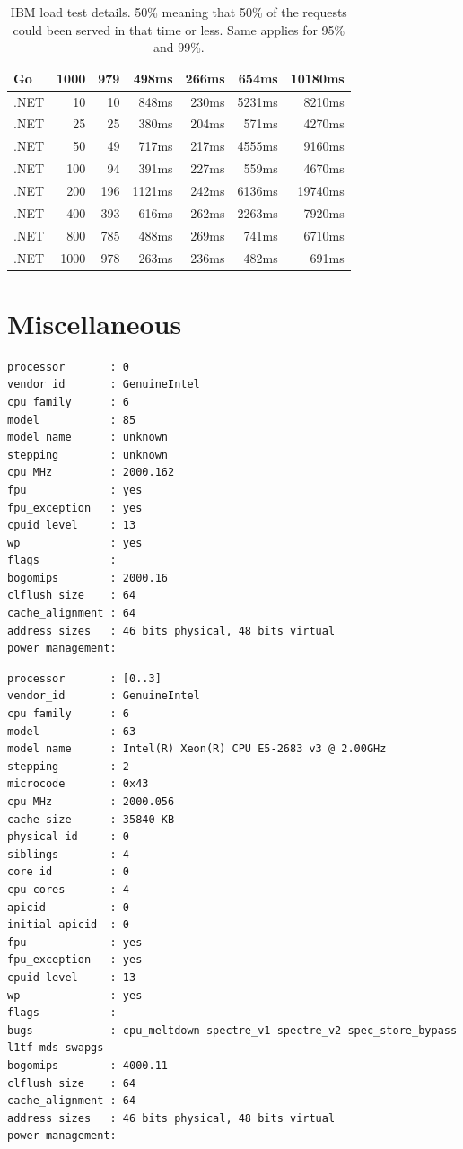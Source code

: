 \begin{table}[h]
\begin{tabular}{|l|r|r|r|r|r|r|}
Go	&	1000	&	979	&	498ms	&	266ms	&	654ms	&	10180ms	\\ \hline
.NET	&	10	&	10	&	848ms	&	230ms	&	5231ms	&	8210ms	\\ \hline
.NET	&	25	&	25	&	380ms	&	204ms	&	571ms	&	4270ms	\\ \hline
.NET	&	50	&	49	&	717ms	&	217ms	&	4555ms	&	9160ms	\\ \hline
.NET	&	100	&	94	&	391ms	&	227ms	&	559ms	&	4670ms	\\ \hline
.NET	&	200	&	196	&	1121ms	&	242ms	&	6136ms	&	19740ms	\\ \hline
.NET	&	400	&	393	&	616ms	&	262ms	&	2263ms	&	7920ms	\\ \hline
.NET	&	800	&	785	&	488ms	&	269ms	&	741ms	&	6710ms	\\ \hline
.NET	&	1000	&	978	&	263ms	&	236ms	&	482ms	&	691ms	\\ \hline
    \end{tabular}
    \caption[IBM load test details]{IBM load test details. 50\% meaning that 50\% of the requests could been served in that time or less. Same applies for 95\% and 99\%.}
    \label{table:ibm_load_test}
\end{table}


\chapter{Miscellaneous}

\begin{lstlisting}[frame=single,caption={Google Cloud Functions - Example content of \texttt{/proc/cpuinfo}},label=lst:cpuinfo]
processor       : 0
vendor_id       : GenuineIntel
cpu family      : 6
model           : 85
model name      : unknown
stepping        : unknown
cpu MHz         : 2000.162
fpu             : yes
fpu_exception   : yes
cpuid level     : 13
wp              : yes
flags           :
bogomips        : 2000.16
clflush size    : 64
cache_alignment : 64
address sizes   : 46 bits physical, 48 bits virtual
power management:
\end{lstlisting}

\begin{lstlisting}[frame=single,caption={IBM Cloud Functions - Example content of \texttt{/proc/cpuinfo}},label=lst:cpuinfo2]
processor       : [0..3]
vendor_id       : GenuineIntel
cpu family      : 6
model           : 63
model name      : Intel(R) Xeon(R) CPU E5-2683 v3 @ 2.00GHz
stepping        : 2
microcode       : 0x43
cpu MHz         : 2000.056
cache size      : 35840 KB
physical id     : 0
siblings        : 4
core id         : 0
cpu cores       : 4
apicid          : 0
initial apicid  : 0
fpu             : yes
fpu_exception   : yes
cpuid level     : 13
wp              : yes
flags           : 
bugs            : cpu_meltdown spectre_v1 spectre_v2 spec_store_bypass l1tf mds swapgs
bogomips        : 4000.11
clflush size    : 64
cache_alignment : 64
address sizes   : 46 bits physical, 48 bits virtual
power management:
\end{lstlisting}
